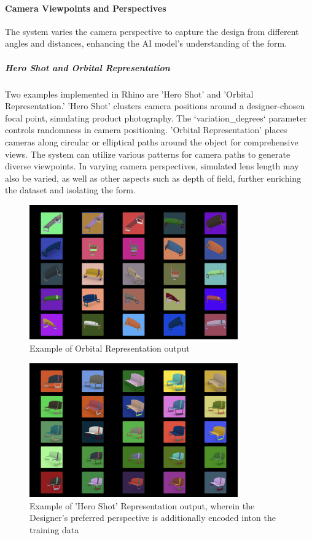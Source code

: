 \documentclass[12pt]{article}
\begin{document}
\paragraph{Camera Viewpoints and Perspectives}
The system varies the camera perspective to capture the design from different angles and distances, enhancing the AI model's understanding of the form.

\subparagraph{Hero Shot and Orbital Representation}
Two examples implemented in Rhino are 'Hero Shot' and 'Orbital Representation.' 'Hero Shot' clusters camera positions around a designer-chosen focal point, simulating product photography. The `variation\_degrees` parameter controls randomness in camera positioning. 'Orbital Representation' places cameras along circular or elliptical paths around the object for comprehensive views. The system can utilize various patterns for camera paths to generate diverse viewpoints. In varying camera perspectives, simulated lens length may also be varied, as well as other aspects such as depth of field, further enriching the dataset and isolating the form.

\begin{figure}[H]
    \centering
    \includegraphics[width=0.8\textwidth]{figures/figure-process-orbital-representation-only-color.jpg}
    \caption{Example of Orbital Representation output}
    \label{fig:class_name_input}
\end{figure}

\begin{figure}[H]
    \centering
    \includegraphics[width=0.8\textwidth]{figures/figure-process-hero-shot-only-color.jpg}
    \caption{Example of 'Hero Shot' Representation output, wherein the Designer's preferred perspective is additionally encoded inton the training data}
    \label{fig:class_name_input}
\end{figure}
\end{document}
